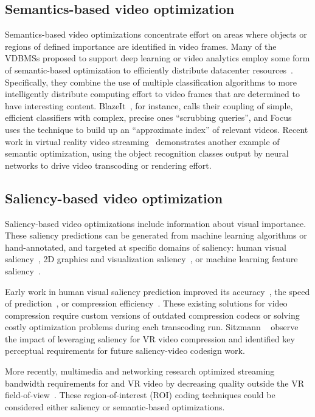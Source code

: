 \subsection{Semantics-based video optimization}
Semantics-based video optimizations concentrate effort on areas where objects or regions of defined importance are identified in video frames.
Many of the VDBMSs proposed to support deep learning or video analytics employ some form of semantic-based optimization to efficiently distribute datacenter resources~\cite{videostorm, chameleon18sigcomm, focus18osdi, blazeit, noscope}.
Specifically, they combine the use of multiple classification algorithms to more intelligently distribute computing effort to video frames that are determined to have interesting content.
BlazeIt~\cite{blazeit}, for instance, calls their coupling of simple, efficient classifiers with complex, precise ones ``scrubbing queries'', and Focus~\cite{focus18osdi} uses the technique to build up an ``approximate index'' of relevant videos.
Recent work in virtual reality video streaming~\cite{leng2018semantic,leng2019vrv} demonstrates another example of semantic optimization, using the object recognition classes output by neural networks to drive video transcoding or rendering effort.

\subsection{Saliency-based video optimization}
Saliency-based video optimizations include information about visual importance.
These saliency predictions can be generated from machine learning algorithms or hand-annotated, and targeted at specific domains of saliency: human visual saliency~\cite{lee2012perceptualcodingsurvey}, 2D graphics and visualization saliency~\cite{borkin2013makes,Bylinskii:2017:LVI:3126594.3126653}, or machine learning feature saliency~\cite{olah2018the,Simonyan2013DeepIC,Zeiler2014VisualizingAU,Zintgraf2017VisualizingDN}.

Early work in human visual saliency prediction improved its accuracy~\cite{li2011visual, lee2012perceptualcodingsurvey}, the speed of prediction~\cite{GUPTA20131006, zund2013content, 5223506}, or compression efficiency~\cite{zund2013content, 8117038, 5223506,hadizadeh2014vidcomp,sitzmann2018saliency}.
These existing solutions for video compression require custom versions of outdated compression codecs or solving costly optimization problems during each transcoding run.
Sitzmann \etal~\cite{sitzmann2018saliency} observe the impact of leveraging saliency for VR video compression and identified key perceptual requirements for future saliency-video codesign work.

More recently, multimedia and networking research optimized streaming bandwidth requirements for \threesixty and VR video by decreasing quality outside the VR field-of-view~\cite{Fan:2017:FPV:3083165.3083180,fov-cloud-ryoo,saliency-map,visualcloud2017haynes}.
These region-of-interest (ROI) coding techniques could be considered either saliency or semantic-based optimizations.
